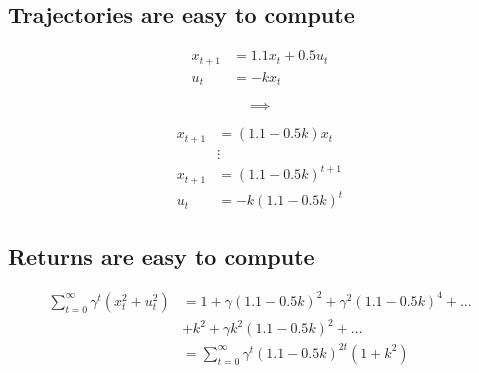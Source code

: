 \documentclass[
  letterpaper,
  DIV=11,
  numbers=noendperiod,
  oneside]{scrartcl}
\begin{document}

\subsection{Trajectories are easy to
compute}\label{trajectories-are-easy-to-compute}

\begin{figure}

\begin{minipage}{0.46\linewidth}
\begin{align}
x_{t+1} &= 1.1 x_t + 0.5 u_t\\
u_t &= -k x_t
\end{align}\end{minipage}%
%
\begin{minipage}{0.09\linewidth}
\[\implies\]\end{minipage}%
%
\begin{minipage}{0.46\linewidth}
\begin{align}
x_{t+1} &= \left( 1.1 - 0.5 k \right)x_t \\
&\vdots\\
x_{t+1} &= \left( 1.1 - 0.5 k \right)^{t+1} \\
u_t &= -k \left( 1.1 - 0.5 k \right)^t
\end{align}\end{minipage}%

\end{figure}%

\subsection{Returns are easy to
compute}\label{returns-are-easy-to-compute}

\begin{align}
\sum_{t=0}^{\infty} \gamma^t \left( x_t^2 +  u_t^2 \right) &= 1 + \gamma (1.1-0.5k)^2 + \gamma^2 (1.1-0.5k)^4  + \ldots\\
&+  k^2  + \gamma  k^2 (1.1-0.5k)^2  + \ldots \\
&= \sum_{t=0}^{\infty} \gamma^t (1.1-0.5k)^{2t} (1 +  k^2) 
\end{align}

\end{document}
